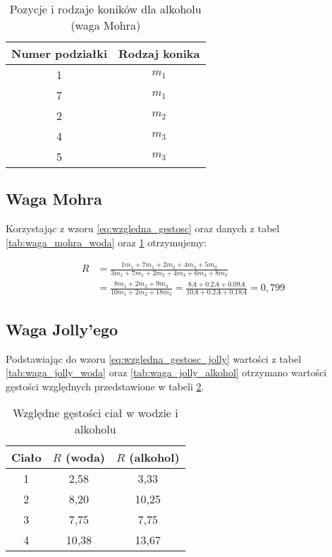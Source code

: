 \documentclass[a4paper,12pt]{article}
\begin{document}
\begin{table}[H]
    \centering
    \begin{tabular}{|c|c|}
        \hline
        Numer podziałki & Rodzaj konika \\
        \hline
        1 & $m_1$ \\
        7 & $m_1$ \\
        2 & $m_2$ \\
        4 & $m_3$ \\
        5 & $m_3$ \\
        \hline
    \end{tabular}
    \caption{Pozycje i rodzaje koników dla alkoholu (waga Mohra)}
    \label{tab:waga_mohra_alkohol}
\end{table}


\subsection{Waga Mohra}

Korzystając z wzoru \eqref{eq:wzgledna_gestosc} oraz danych z tabel \ref{tab:waga_mohra_woda} oraz \ref{tab:waga_mohra_alkohol} otrzymujemy:

\begin{align*}
    R & = \frac{1 m_1 + 7 m_1 + 2 m_2 + 4 m_3 + 5 m_3}{3 m_1 + 7 m_1 + 2 m_2 + 4 m_3 + 6 m_3 + 8 m_3}                            \\
      & = \frac{8 m_1 + 2 m_2 + 9 m_3}{10 m_1 + 2 m_2 + 18 m_3}  = \frac{8 A + 0.2 A + 0.09 A}{10 A + 0.2 A + 0.18 A}  = 0{,}799
\end{align*}


\subsection{Waga Jolly'ego}

Podstawiając do wzoru \eqref{eq:wzgledna_gestosc_jolly} wartości z tabel \ref{tab:waga_jolly_woda} oraz \ref{tab:waga_jolly_alkohol} otrzymano wartości gęstości względnych przedstawione w tabeli \ref{tab:wzgledna_gestosc_jolly}.

\begin{table}[H]
    \centering
    \begin{tabular}{|c|c|c|}
        \hline
        \textbf{Ciało} & $R$ (woda) & $R$ (alkohol) \\
        \hline
        1 & 2{,}58 & 3{,}33 \\
        \hline
        2 & 8{,}20 & 10{,}25 \\
        \hline
        3 & 7{,}75 & 7{,}75 \\
        \hline
        4 & 10{,}38 & 13{,}67 \\
        \hline
    \end{tabular}
    \caption{Względne gęstości ciał w wodzie i alkoholu}
    \label{tab:wzgledna_gestosc_jolly}
\end{table}
\end{document}
